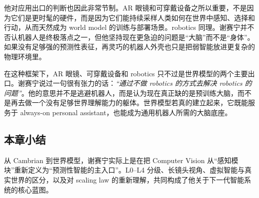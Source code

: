 他对应用出口的判断也因此非常节制。AR 眼镜和可穿戴设备之所以重要，不是因为它们是更时髦的硬件，而是因为它们能持续采样人类如何在世界中感知、选择和行动，从而天然成为 world model 的训练与部署场景。robotics 同理。谢赛宁并不否认机器人是终极落点之一，但他坚持现在更急迫的问题是“大脑”而不是“身体”。如果没有足够强的预测性表征，再灵巧的机器人外壳也只是把弱智能放进更复杂的物理环境里。

在这种框架下，AR 眼镜、可穿戴设备和 robotics 只不过是世界模型的两个主要出口。谢赛宁说过一句很有张力的话：\textit{``通过不做 robotics 的方式去解决 robotics 的问题''}。他的意思并不是逃避机器人，而是认为现在真正缺的是预训练大脑，而不是再去做一个没有足够世界理解能力的躯体。世界模型若真的建立起来，它既能服务于 always-on personal assistant，也能成为通用机器人所需的大脑底座。

\subsection{本章小结}

从 Cambrian 到世界模型，谢赛宁实际上是在把 Computer Vision 从“感知模块”重新定义为“预测性智能的主入口”。L0--L4 分级、长镜头视角、虚拟智能与真实世界的区分，以及对 scaling law 的重新理解，共同构成了他关于下一代智能系统的核心蓝图。

